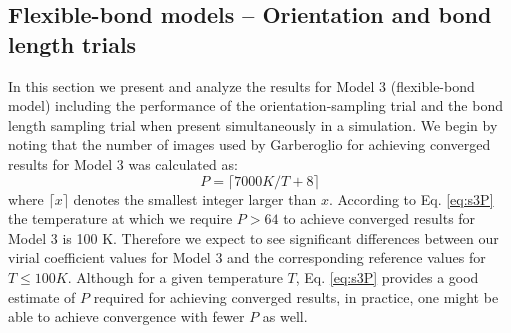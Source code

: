         \subsection{Flexible-bond models -- Orientation and bond length trials}
            In this section we present and analyze the results for Model 3 (flexible-bond model) including the performance of the orientation-sampling trial and the bond length sampling trial when present simultaneously in a simulation. We begin by noting that the number of images used by Garberoglio for achieving converged results \cite{Garberoglio2014} for Model 3 was calculated as:
            \begin{equation}
            \label{eq:s3P}
                P = \lceil 7000 K/T + 8 \rceil
            \end{equation}
            where $\lceil x \rceil$ denotes the smallest integer larger than $x$.
According to Eq. \eqref{eq:s3P} the temperature at which we require $P > 64$ to achieve converged results for Model 3 is 100 K. Therefore we expect to see significant differences between our virial coefficient values for Model 3 and the corresponding reference values for $T \le 100 K$. Although for a given temperature $T$, Eq. \eqref{eq:s3P} provides a good estimate of $P$ required for achieving converged results, in practice, one might be able to achieve convergence with fewer $P$ as well.

